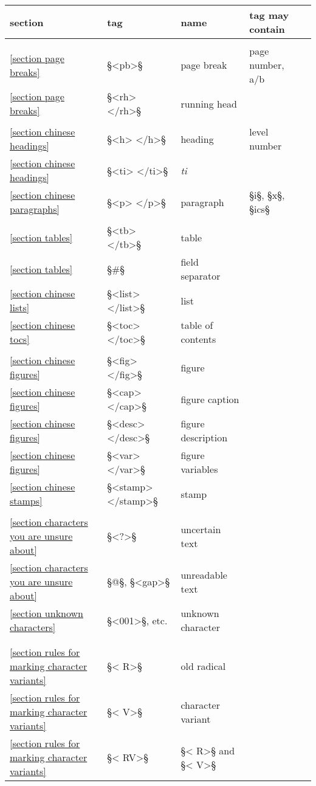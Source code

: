 \documentclass[fontsize=11pt, paper=a4, 
DIV15,
headings=normal,
parskip=half-, 
numbers=noenddot]{scrartcl}
\newcommand{\chin}[1]{{\fontspec{Sun-ExtA}{#1}}}
\newcommand{\z}[1]{\chin{#1}} %
\begin{document}
\begin{longtable}[l]{@{}llll@{}l@{}}
section & tag & name & tag may contain \\[1mm]
\hline \\
\ref{section page breaks} & §<pb>§ & page break & page number, a/b \\
\ref{section page breaks} & §<rh> </rh>§ & running head &\\
\\
\ref{section chinese headings} & §<h> </h>§ & heading & level number \\
\ref{section chinese headings} & §<ti> </ti>§ & \emph{ti} \z{題} &\\
\ref{section chinese paragraphs} & §<p> </p>§ & paragraph & §i§, §x§, §ics§ \\
\\
\ref{section tables} & §<tb> </tb>§ & table &\\
\ref{section tables} & §#§ & field separator \\
\ref{section chinese lists} & §<list> </list>§ & list &\\
\ref{section chinese tocs} & §<toc> </toc>§ & table of contents &\\
\\
\ref{section chinese figures} & §<fig> </fig>§ & figure & \\
\ref{section chinese figures} & §<cap> </cap>§ & figure caption &\\ 
\ref{section chinese figures} & §<desc> </desc>§ & figure description &\\ 
\ref{section chinese figures} & §<var> </var>§ & figure variables &\\ 
\ref{section chinese stamps} & §<stamp> </stamp>§ & stamp & \\
\\
\ref{section characters you are unsure about} & §<?>§ & uncertain text & \\
\ref{section characters you are unsure about} & §@§, §<gap>§ & unreadable text & \\
\ref{section unknown characters} & §<001>§, etc. & unknown character & \\ 
\\
\hline \\
\ref{section rules for marking character variants} & §< R>§ & old radical & \\
\ref{section rules for marking character variants} & §< V>§ & character variant & \\
\ref{section rules for marking character variants} & §< RV>§ & §< R>§ and §< V>§ & \\

\end{longtable}
\end{document}

